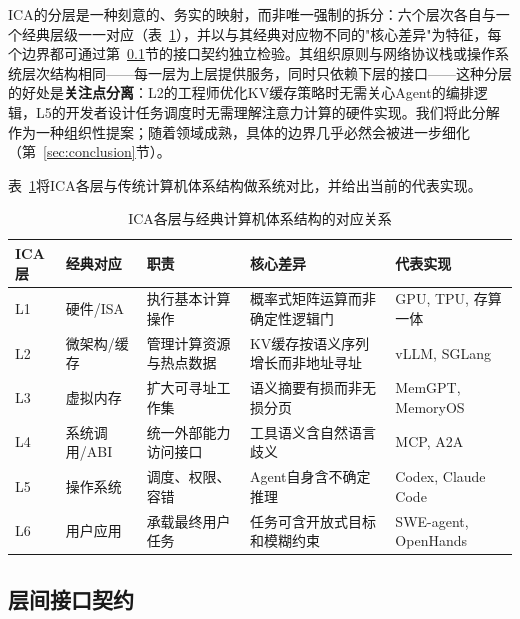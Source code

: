 ICA的分层是一种刻意的、务实的映射，而非唯一强制的拆分：六个层次各自与一个经典层级一一对应（表~\ref{tab:icam}），并以与其经典对应物不同的"核心差异"为特征，每个边界都可通过第~\ref{sec:icam-interfaces}节的接口契约独立检验。其组织原则与网络协议栈或操作系统层次结构相同——每一层为上层提供服务，同时只依赖下层的接口——这种分层的好处是\textbf{关注点分离}：L2的工程师优化KV缓存策略时无需关心Agent的编排逻辑，L5的开发者设计任务调度时无需理解注意力计算的硬件实现。我们将此分解作为一种组织性提案；随着领域成熟，具体的边界几乎必然会被进一步细化（第~\ref{sec:conclusion}节）。

表~\ref{tab:icam}将ICA各层与传统计算机体系结构做系统对比，并给出当前的代表实现。

\begin{table}[htbp]
\centering
\footnotesize
\caption{ICA各层与经典计算机体系结构的对应关系}
\label{tab:icam}
\begin{tabularx}{\textwidth}{p{}p{}p{}p{}p{}}
\toprule
ICA层 & 经典对应 & 职责 & 核心差异 & 代表实现 \\
\midrule
L1 & 硬件/ISA & 执行基本计算操作 & 概率式矩阵运算而非确定性逻辑门 & GPU, TPU, 存算一体\cite{wolters2024computeinmemory} \\
L2 & 微架构/缓存 & 管理计算资源与热点数据 & KV缓存按语义序列增长而非地址寻址 & vLLM, SGLang\cite{kwon2023pagedattention,sglang2024} \\
L3 & 虚拟内存 & 扩大可寻址工作集 & 语义摘要有损而非无损分页 & MemGPT, MemoryOS\cite{memgpt2023,memoryos2025} \\
L4 & 系统调用/ABI & 统一外部能力访问接口 & 工具语义含自然语言歧义 & MCP, A2A\cite{mcp_intro_2026,agentprotocols2025} \\
L5 & 操作系统 & 调度、权限、容错 & Agent自身含不确定推理 & Codex, Claude Code\cite{openai_codex_overview_2026,anthropic_claudecode_overview_2026} \\
L6 & 用户应用 & 承载最终用户任务 & 任务可含开放式目标和模糊约束 & SWE-agent, OpenHands\cite{sweagent2024,openhands_paper_2025} \\
\bottomrule
\end{tabularx}
\end{table}

\subsection{层间接口契约}
\label{sec:icam-interfaces}


